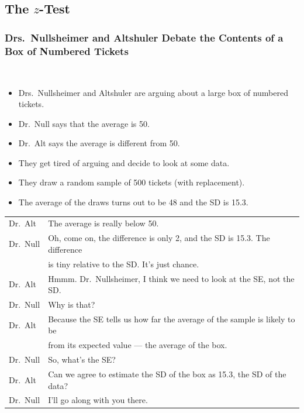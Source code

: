 \documentclass[t]{beamer}
\begin{document}
\subsection{The $z$-Test}
\begin{frame}
\frametitle{Drs.\ Nullsheimer and Altshuler Debate the Contents of a Box of Numbered Tickets }
{\ }\vspace{-25pt}

{\footnotesize
\begin{itemize}
\item Drs.\ Nullsheimer and Altshuler are arguing about a large box of numbered tickets.  
\item Dr.\ Null says that the average is 50.  
\item Dr.\ Alt says the average is different from 50.
\item They get tired of arguing and decide to look at some data.
\item They draw a random sample of 500 tickets (with replacement).  
\item The average of the draws turns out to be 48 and the SD is 15.3.
\end{itemize}
\smallskip

\begin{tabular}{ll}
{\color{blue}Dr.\ Alt} & {\color{blue}The average is really below 50.}\\
Dr.\ Null &Oh, come on, the difference is only 2, and the SD is 15.3.  The difference \\  & 
   is tiny relative to the SD.  It's just chance.\\
{\color{blue}Dr.\ Alt} & {\color{blue}Hmmm. Dr.\ Nullsheimer, I think we need to look at the SE, not the SD.}\\
Dr.\ Null & Why is that?\\
{\color{blue}Dr.\ Alt} & {\color{blue}Because the SE tells us how far the average of the sample is likely to be } \\ &
   {\color{blue}from its expected value --- the average of the box.}\\
Dr.\ Null & So, what's the SE?\\
{\color{blue}Dr.\ Alt} & {\color{blue}Can we agree to estimate the SD of the box as 15.3, the SD of the data?}\\
Dr.\ Null & I'll go along with you there.\\
\end{tabular}}
\end{frame}
\end{document}
